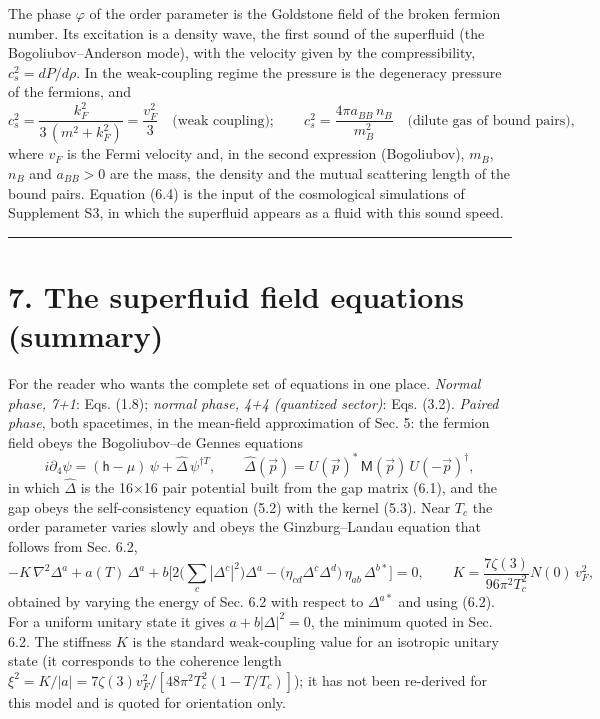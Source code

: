 \documentclass[
  10pt,
]{article}
\begin{document}
The phase \(\varphi\) of the order parameter is the Goldstone field of
the broken fermion number. Its excitation is a density wave, the first
sound of the superfluid (the Bogoliubov--Anderson mode), with the
velocity given by the compressibility, \(c_s^2=dP/d\rho\). In the
weak-coupling regime the pressure is the degeneracy pressure of the
fermions, and
\[c_s^2=\frac{k_F^2}{3\,(m^2+k_F^2)}=\frac{v_F^2}{3}\quad\text{(weak coupling)};\qquad c_s^2=\frac{4\pi a_{BB}\,n_B}{m_B^2}\quad\text{(dilute gas of bound pairs)},\tag{6.4}\]
where \(v_F\) is the Fermi velocity and, in the second expression
(Bogoliubov), \(m_B\), \(n_B\) and \(a_{BB}>0\) are the mass, the
density and the mutual scattering length of the bound pairs. Equation
(6.4) is the input of the cosmological simulations of Supplement S3, in
which the superfluid appears as a fluid with this sound speed.

\begin{center}\rule{0.5\linewidth}{0.5pt}\end{center}

\hypertarget{the-superfluid-field-equations-summary}{%
\section{7. The superfluid field equations
(summary)}\label{the-superfluid-field-equations-summary}}

For the reader who wants the complete set of equations in one place.
\emph{Normal phase, 7+1}: Eqs. (1.8); \emph{normal phase, 4+4 (quantized
sector)}: Eqs. (3.2). \emph{Paired phase}, both spacetimes, in the
mean-field approximation of Sec. 5: the fermion field obeys the
Bogoliubov--de Gennes equations
\[i\partial_4\psi=(\mathsf h-\mu)\,\psi+\hat\Delta\,\psi^{\dagger T},\qquad
\hat\Delta(\vec p)=U(\vec p)^{*}\,\mathsf M(\vec p)\,U(-\vec p)^{\dagger},\tag{7.1}\]
in which \(\hat\Delta\) is the 16×16 pair potential built from the gap
matrix (6.1), and the gap obeys the self-consistency equation (5.2) with
the kernel (5.3). Near \(T_c\) the order parameter varies slowly and
obeys the Ginzburg--Landau equation that follows from Sec. 6.2,
\[-K\,\nabla^2\Delta^a+a(T)\,\Delta^a+b\Big[2\Big(\sum_c|\Delta^c|^2\Big)\Delta^a-\big(\eta_{cd}\Delta^c\Delta^d\big)\,\eta_{ab}\,\Delta^{b*}\Big]=0,\qquad K=\frac{7\zeta(3)}{96\pi^2T_c^2}N(0)\,v_F^2,\tag{7.2}\]
obtained by varying the energy of Sec. 6.2 with respect to
\(\Delta^{a*}\) and using (6.2). For a uniform unitary state it gives
\(a+b|\Delta|^2=0\), the minimum quoted in Sec. 6.2. The stiffness \(K\)
is the standard weak-coupling value for an isotropic unitary state (it
corresponds to the coherence length
\(\xi^2=K/|a|=7\zeta(3)v_F^2/[48\pi^2T_c^2(1-T/T_c)]\)); it has not been
re-derived for this model and is quoted for orientation only.
\end{document}
